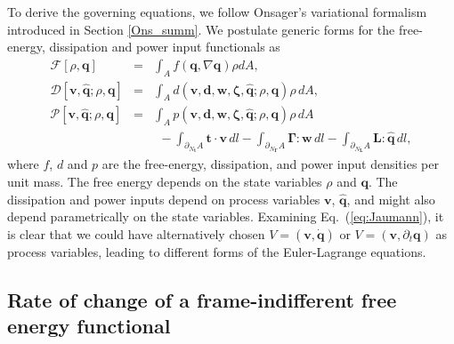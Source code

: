 \documentclass[12pt]{iopart}
\begin{document}
	
	
	To derive the governing equations, we follow Onsager's variational formalism introduced in Section \ref{Ons_summ}. We postulate generic forms for the free-energy, dissipation and power input functionals as
	\begin{eqnarray}
		\mathcal{F}\left[\rho,\bm{q}\right] &=& \int_A f(\bm{q},\nabla\bm{q}) \rho dA, \label{eq:free_energy}\\
		\mathcal{D}\left[\bm{v},\widehat{\bm{q}}; \rho,\bm{q}\right] &=& \int_A d(\bm{v},\bm{d},\bm{w},\bm{\zeta},\widehat{\bm{q}};\rho,\bm{q}) \rho \,dA,\\
		\mathcal{P}\left[\bm{v},\widehat{\bm{q}}; \rho,\bm{q}\right] &=& \int_A p(\bm{v},\bm{d},\bm{w},\bm{\zeta},\widehat{\bm{q}};\rho,\bm{q}) \rho \,dA \nonumber\\
		& &~~- \int_{\partial_{N_{\bm{t}}} A} \bm{t} \cdot \bm{v} \,dl -  \int_{\partial_{N_{\bm{\Gamma}}} A} \bm{\Gamma}:\bm{w} \,dl -  \int_{\partial_{N_{\bm{L}}} A} \bm{L}:\widehat{\bm{q}} \,dl, \label{eq:power}
	\end{eqnarray}
	where $f$, $d$ and $p$ are the free-energy, dissipation, and power input densities per unit mass. The free energy depends on the state variables $\rho$ and $\bm{q}$. The dissipation and power inputs depend on process variables $\bm{v}$, $\widehat{\bm{q}}$, and might also depend parametrically on the state variables. {Examining Eq.~(\ref{eq:Jaumann}), it is clear that we could have alternatively chosen $V = \left(\bm{v}, \dot{\bm{q}}\right)$ or $V = \left(\bm{v}, \partial_t{\bm{q}}\right)$ as process variables, leading to different forms of the Euler-Lagrange equations.} 
	
	
	
	\subsection{Rate of change of a frame-indifferent free energy functional}\label{app:rate_of_change_energy}
	
\end{document}
